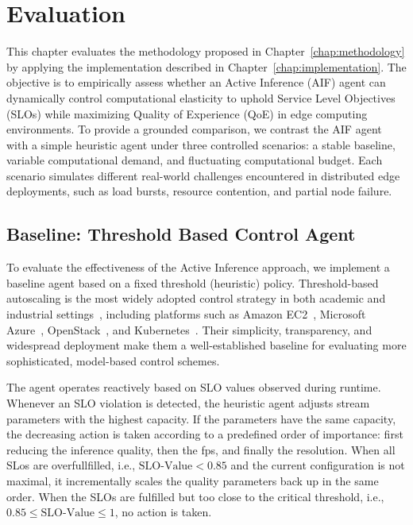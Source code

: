 \chapter{Evaluation}
\label{chap:evaluation}

This chapter evaluates the methodology proposed in Chapter~\ref{chap:methodology} by applying the implementation described in Chapter~\ref{chap:implementation}. The objective is to empirically assess whether an Active Inference (AIF) agent can dynamically control computational elasticity to uphold Service Level Objectives (SLOs) while maximizing Quality of Experience (QoE) in edge computing environments. To provide a grounded comparison, we contrast the AIF agent with a simple heuristic agent under three controlled scenarios: a stable baseline, variable computational demand, and fluctuating computational budget. Each scenario simulates different real-world challenges encountered in distributed edge deployments, such as load bursts, resource contention, and partial node failure.

\section{Baseline: Threshold Based Control Agent}
\label{sec:evaluation-heuristic}

To evaluate the effectiveness of the Active Inference approach, we implement a baseline agent based on a fixed threshold (heuristic) policy. Threshold-based autoscaling is the most widely adopted control strategy in both academic and industrial settings~\cite{arabnejad_comparison_2017}, including platforms such as Amazon EC2~\cite{noauthor_amazon_nodate}, Microsoft Azure~\cite{noauthor_cloud_nodate}, OpenStack~\cite{noauthor_open_nodate}, and Kubernetes~\cite{noauthor_production-grade_nodate}. Their simplicity, transparency, and widespread deployment make them a well-established baseline for evaluating more sophisticated, model-based control schemes.

The agent operates reactively based on SLO values observed during runtime. Whenever an SLO violation is detected, the heuristic agent adjusts stream parameters with the highest capacity. If the parameters have the same capacity, the decreasing action is taken according to a predefined order of importance: first reducing the inference quality, then the fps, and finally the resolution. When all SLos are overfullfilled, i.e., \(\text{SLO-Value} < 0.85\) and the current configuration is not maximal, it incrementally scales the quality parameters back up in the same order.
When the SLOs are fulfilled but too close to the critical threshold, i.e., \(0.85 \leq \text{SLO-Value} \leq 1\), no action is taken.

